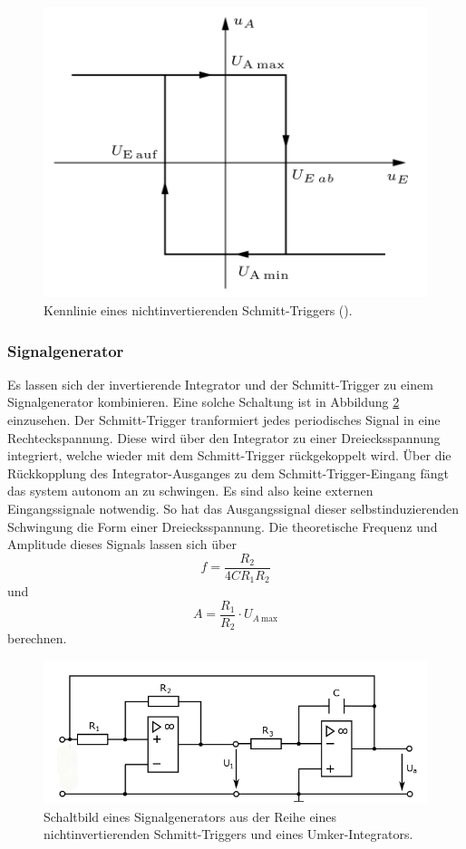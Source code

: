 \begin{figure}
    \centering 
    \includegraphics[width=.5\textwidth]{Bilder/Kenn_Schmitt.PNG}
    \caption{Kennlinie eines nichtinvertierenden Schmitt-Triggers (\cite[S.~115]{Clausert}).}
    \label{fig:Kenn_Schmitt}
\end{figure}

\subsubsection{Signalgenerator}
Es lassen sich der invertierende Integrator und der Schmitt-Trigger zu einem Signalgenerator kombinieren.
Eine solche Schaltung ist in Abbildung \ref{fig:Signal} einzusehen.
Der Schmitt-Trigger tranformiert jedes periodisches Signal in eine Rechteckspannung.
Diese wird über den Integrator zu einer Dreiecksspannung integriert, welche wieder mit dem Schmitt-Trigger rückgekoppelt wird.
Über die Rückkopplung des Integrator-Ausganges zu dem Schmitt-Trigger-Eingang fängt das system autonom an zu schwingen.
Es sind also keine externen Eingangssignale notwendig.
So hat das Ausgangssignal dieser selbstinduzierenden Schwingung die Form einer Dreiecksspannung.
Die theoretische Frequenz und Amplitude dieses Signals lassen sich über
\begin{equation}
    f = \frac{R_2}{4CR_1R_2}
    \label{eq:sig_f}
\end{equation}
und 
\begin{equation}
    A = \frac{R_1}{R_2}\cdot U_{A \: \text{max}}
    \label{eq:sig_a}
\end{equation}
berechnen.

\begin{figure}
    \centering 
    \includegraphics[width=.9\textwidth]{Bilder/Signal.png}
    \caption{Schaltbild eines Signalgenerators aus der Reihe eines nichtinvertierenden Schmitt-Triggers und eines Umker-Integrators.}
    \label{fig:Signal}
\end{figure}


